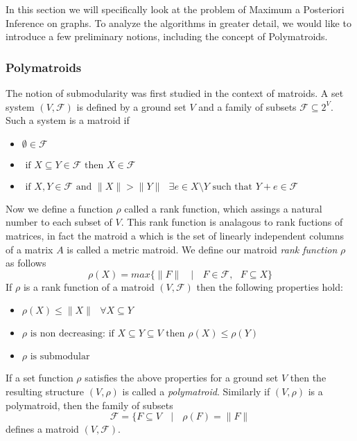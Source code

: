 In this section we will specifically look at the problem of Maximum a Posteriori Inference on graphs. To analyze the algorithms in greater detail, we would like to introduce a few preliminary notions, including the concept of Polymatroids. 
\subsubsection{Polymatroids}
The notion of submodularity was first studied in the context of matroids. A set system $(V,\mathcal{F})$ is defined by a ground set $V$ and a family of subsets $\mathcal{F} \subseteq 2^V$. Such a system is a matroid if
\begin{itemize}

\item $\emptyset \in \mathcal{F}$
\item $\text{ if } X \subseteq Y \in \mathcal{F} \text{ then } X\in \mathcal{F}$
\item $\text{ if } X,Y \in \mathcal{F} \text{ and } \|X\| > \|Y\| \text{ } \exists e\in X\setminus Y \text{ such that } Y+e\in\mathcal{F}$
\end{itemize}

Now we define a function $\rho$ called a rank function, which assings a natural number to each subset of $V$. This rank function is analagous to rank fuctions of matrices, in fact the matroid a which is the set of linearly independent columns of a matrix $A$ is called a metric matroid. We define our matroid {\it rank function} $\rho$ as follows
\[
\rho(X) = max\{\|F\| \text{ }\mid \text{ } F\in\mathcal{F}, \text{ }F\subseteq X\}
\]
If $\rho$ is a rank function of a matroid $(V,\mathcal{F})$ then the following properties hold:
\begin{itemize}
\item $\rho(X) \leq \|X\| \text{ }\forall X\subseteq Y$
\item $\rho \text{ is non decreasing: if } X \subseteq Y \subseteq V \text{ then } \rho(X) \leq \rho(Y)$
\item $\rho \text{ is submodular }$
\end{itemize}

If a set function $\rho$ satisfies the above properties for a ground set $V$ then the resulting structure $(V,\rho)$ is called a {\it polymatroid}. Similarly if $(V,\rho)$ is a polymatroid, then the family of subsets
\[
\mathcal{F} = \{ F\subseteq V \text{ }\mid \text{ } \rho(F) = \|F\|
\]
defines a matroid $(V,\mathcal{F})$.

